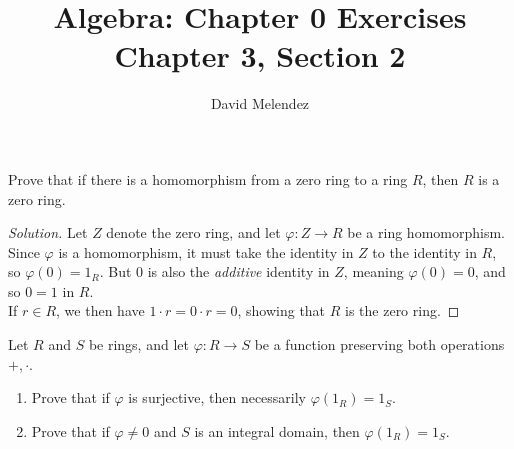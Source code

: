 \documentclass[12pt]{article}
\newenvironment{problem}[2][Problem]{\begin{trivlist}
\item[\hskip \labelsep {\bfseries #1}\hskip \labelsep {\bfseries #2.}]}{\end{trivlist}}
\newenvironment{solution}
  {\renewcommand\qedsymbol{$\blacksquare$}\begin{proof}[Solution]}
{\end{proof}}
\theoremstyle{remark}
\begin{document}
\title{Algebra: Chapter 0 Exercises\\ \large Chapter 3, Section 2}
\author{David Melendez}
\maketitle

\begin{problem}{1}
Prove that if there is a homomorphism from a zero ring to a ring $R$, then $R$ is a zero ring.
\end{problem}
\begin{solution}
  Let $Z$ denote the zero ring, and let $\varphi : Z\to R$ be a ring homomorphism.
  Since $\varphi$ is a homomorphism, it must take the identity in $Z$ to the identity in $R$,
  so $\varphi(0) = 1_R$.
  But 0 is also the \textit{additive} identity in $Z$, meaning $\varphi(0) = 0$,
  and so $0 = 1$ in $R$.\\
  \indent If $r\in R$, we then have $1\cdot r = 0\cdot r = 0$, showing that $R$ is the zero ring.
\end{solution}

\begin{problem}{2}
  Let $R$ and $S$ be rings, and let $\varphi : R\to S$ be a function preserving both operations
  $+,\cdot$.
  \begin{enumerate}
    \item Prove that if $\varphi$ is surjective, then necessarily $\varphi(1_R) = 1_S$.
    \item Prove that if $\varphi\neq0$ and $S$ is an integral domain, then $\varphi(1_R)=1_S$.
  \end{enumerate}
\end{problem}
\end{document}
